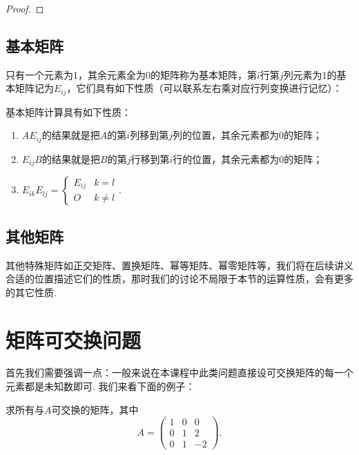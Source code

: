 \begin{proof}

\end{proof}

\subsection{基本矩阵}

只有一个元素为1，其余元素全为0的矩阵称为基本矩阵，第$i$行第$j$列元素为1的基本矩阵记为$E_{ij}$，它们具有如下性质（可以联系左右乘对应行列变换进行记忆）：
\begin{theorem}
    基本矩阵计算具有如下性质：
    \begin{enumerate}
        \item $AE_{ij}$的结果就是把$A$的第$i$列移到第$j$列的位置，其余元素都为0的矩阵；

        \item $E_{ij}B$的结果就是把$B$的第$j$行移到第$i$行的位置，其余元素都为0的矩阵；

        \item $E_{ik}E_{lj} = \begin{cases}
                      E_{ij} & k = l    \\
                      O      & k \neq l
                  \end{cases}$.
    \end{enumerate}
\end{theorem}

\subsection{其他矩阵}

其他特殊矩阵如正交矩阵、置换矩阵、幂等矩阵、幂零矩阵等，我们将在后续讲义合适的位置描述它们的性质，那时我们的讨论不局限于本节的运算性质，会有更多的其它性质.

\section{矩阵可交换问题}

首先我们需要强调一点：一般来说在本课程中此类问题直接设可交换矩阵的每一个元素都是未知数即可. 我们来看下面的例子：
\begin{example}
    求所有与$A$可交换的矩阵，其中
    \[A=\begin{pmatrix}
            1 & 0 & 0  \\
            0 & 1 & 2  \\
            0 & 1 & -2
        \end{pmatrix}.\]
\end{example}

